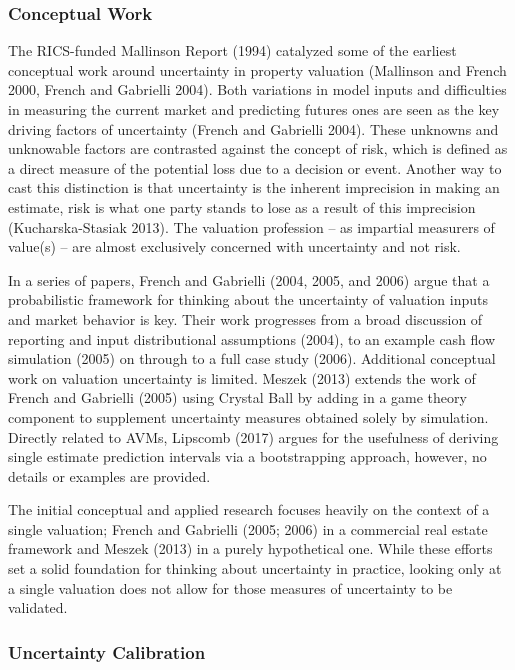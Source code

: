 \documentclass[colTwo]{anon}
\theoremstyle{definition}
\begin{document}
\subsubsection{Conceptual Work}

The RICS-funded Mallinson Report (1994) catalyzed some of the earliest conceptual work around uncertainty in property valuation (Mallinson and French 2000, French and Gabrielli 2004). Both variations in model inputs and difficulties in measuring the current market and predicting futures ones are seen as the key driving factors of uncertainty (French and Gabrielli 2004). These unknowns and unknowable factors are contrasted against the concept of risk, which is defined as a direct measure of the potential loss due to a decision or event.  Another way to cast this distinction is that uncertainty is the inherent imprecision in making an estimate, risk is what one party stands to lose as a result of this imprecision (Kucharska-Stasiak 2013).  The valuation profession -- as impartial measurers of value(s) -- are almost exclusively concerned with uncertainty and not risk.

In a series of papers, French and Gabrielli (2004, 2005, and 2006) argue that a probabilistic framework for thinking about the uncertainty of valuation inputs and market behavior is key. Their work progresses from a broad discussion of reporting and input distributional assumptions (2004), to an example cash flow simulation (2005) on through to a full case study (2006). Additional conceptual work on valuation uncertainty is limited.  Meszek (2013) extends the work of French and Gabrielli (2005) using Crystal Ball by adding in a game theory component to supplement uncertainty measures obtained solely by simulation.  Directly related to AVMs, Lipscomb (2017) argues for the usefulness of deriving single estimate prediction intervals via a bootstrapping approach, however, no details or examples are provided.

The initial conceptual and applied research focuses heavily on the context of a single valuation; French and Gabrielli (2005; 2006) in a commercial real estate framework and Meszek (2013) in a purely hypothetical one. While these efforts set a solid foundation for thinking about uncertainty in practice, looking only at a single valuation does not allow for those measures of uncertainty to be validated.

\subsubsection{Uncertainty Calibration}
\end{document}
